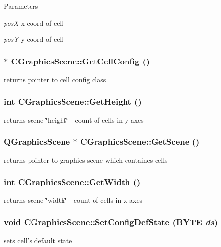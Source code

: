 \begin{DoxyParams}{Parameters}
\item[{\em posX}]x coord of cell \item[{\em posY}]y coord of cell \end{DoxyParams}
\hypertarget{classCGraphicsScene_a97b82b2ded17f05c2cf3b3e110662ce4}{
\subsubsection[{GetCellConfig}]{ $\ast$ CGraphicsScene::GetCellConfig ()}}
\label{classCGraphicsScene_a97b82b2ded17f05c2cf3b3e110662ce4}
returns pointer to cell config class \hypertarget{classCGraphicsScene_ad415c0259dffc4bd72fb59bc1ea23d36}{
\subsubsection[{GetHeight}]{\setlength{\rightskip}{0pt plus 5cm}int CGraphicsScene::GetHeight ()}}
\label{classCGraphicsScene_ad415c0259dffc4bd72fb59bc1ea23d36}
returns scene \char`\"{}height\char`\"{} -\/ count of cells in y axes \hypertarget{classCGraphicsScene_acee66ed8d6c2e4585bcb80a872bbc75c}{
\subsubsection[{GetScene}]{\setlength{\rightskip}{0pt plus 5cm}QGraphicsScene $\ast$ CGraphicsScene::GetScene ()}}
\label{classCGraphicsScene_acee66ed8d6c2e4585bcb80a872bbc75c}
returns pointer to graphics scene which containes cells \hypertarget{classCGraphicsScene_a446b3dd9434dbdee43bf303f4511c919}{
\subsubsection[{GetWidth}]{\setlength{\rightskip}{0pt plus 5cm}int CGraphicsScene::GetWidth ()}}
\label{classCGraphicsScene_a446b3dd9434dbdee43bf303f4511c919}
returns scene \char`\"{}width\char`\"{} -\/ count of cells in x axes \hypertarget{classCGraphicsScene_aa3507a9175e715ef27b7fb066a5c7bab}{
\subsubsection[{SetConfigDefState}]{\setlength{\rightskip}{0pt plus 5cm}void CGraphicsScene::SetConfigDefState (BYTE {\em ds})}}
\label{classCGraphicsScene_aa3507a9175e715ef27b7fb066a5c7bab}
sets cell's default state


